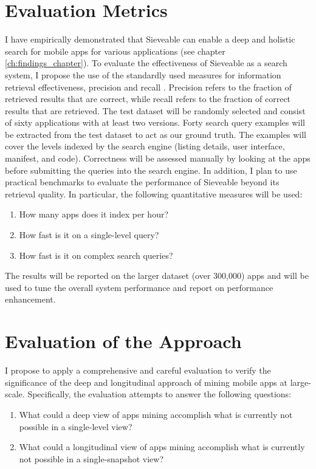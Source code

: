 \section{Evaluation Metrics}
I have empirically demonstrated that Sieveable can enable a deep and holistic search for mobile apps for various applications (see chapter \ref{ch:findings_chapter}).
To evaluate the effectiveness of Sieveable as a search system, I propose the use of the standardly used measures for information retrieval effectiveness, precision and recall \cite{manning_2008_intro_to_IR}.
Precision refers to the fraction of retrieved results that are correct, while recall refers to the fraction of correct results that are retrieved.
The test dataset will be randomly selected and consist of sixty applications with at least two versions.
Forty search query examples will be extracted from the test dataset to act as our ground truth.
The examples will cover the levels indexed by the search engine (listing details, user interface, manifest, and code).
Correctness will be assessed manually by looking at the apps before submitting the queries into the search engine.
In addition, I plan to use practical benchmarks to evaluate the performance of Sieveable beyond its retrieval quality. In particular, the following quantitative measures will be used:
\begin{enumerate}
	\item How many apps does it index per hour?
	\item How fast is it on a single-level query?
	\item How fast is it on complex search queries?
\end{enumerate}
The results will be reported on the larger dataset (over 300,000) apps and will be used to tune the overall system performance and report on performance enhancement.

\section{Evaluation of the Approach}
I propose to apply a comprehensive and careful evaluation to verify the significance of the deep and longitudinal approach of mining mobile apps at large-scale.
Specifically, the evaluation attempts to answer the following questions:
\begin{enumerate}
	\item What could a deep view of apps mining accomplish what is currently not possible in a single-level view?
	\item What could a longitudinal view of apps mining accomplish what is currently not possible in a single-snapshot view?
\end{enumerate}


